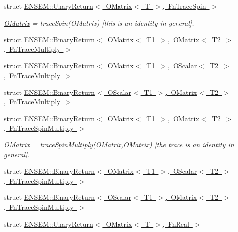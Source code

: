 \begin{DoxyCompactItemize}
struct \mbox{\hyperlink{structENSEM_1_1UnaryReturn_3_01OMatrix_3_01T_01_4_00_01FnTraceSpin_01_4}{E\+N\+S\+E\+M\+::\+Unary\+Return$<$ O\+Matrix$<$ T $>$, Fn\+Trace\+Spin $>$}}
\begin{DoxyCompactList}\small\item\em \mbox{\hyperlink{classENSEM_1_1OMatrix}{O\+Matrix}} = trace\+Spin(\+O\+Matrix) \mbox{[}this is an identity in general\mbox{]}. \end{DoxyCompactList}\item 
struct \mbox{\hyperlink{structENSEM_1_1BinaryReturn_3_01OMatrix_3_01T1_01_4_00_01OMatrix_3_01T2_01_4_00_01FnTraceMultiply_01_4}{E\+N\+S\+E\+M\+::\+Binary\+Return$<$ O\+Matrix$<$ T1 $>$, O\+Matrix$<$ T2 $>$, Fn\+Trace\+Multiply $>$}}
\item 
struct \mbox{\hyperlink{structENSEM_1_1BinaryReturn_3_01OMatrix_3_01T1_01_4_00_01OScalar_3_01T2_01_4_00_01FnTraceMultiply_01_4}{E\+N\+S\+E\+M\+::\+Binary\+Return$<$ O\+Matrix$<$ T1 $>$, O\+Scalar$<$ T2 $>$, Fn\+Trace\+Multiply $>$}}
\item 
struct \mbox{\hyperlink{structENSEM_1_1BinaryReturn_3_01OScalar_3_01T1_01_4_00_01OMatrix_3_01T2_01_4_00_01FnTraceMultiply_01_4}{E\+N\+S\+E\+M\+::\+Binary\+Return$<$ O\+Scalar$<$ T1 $>$, O\+Matrix$<$ T2 $>$, Fn\+Trace\+Multiply $>$}}
\item 
struct \mbox{\hyperlink{structENSEM_1_1BinaryReturn_3_01OMatrix_3_01T1_01_4_00_01OMatrix_3_01T2_01_4_00_01FnTraceSpinMultiply_01_4}{E\+N\+S\+E\+M\+::\+Binary\+Return$<$ O\+Matrix$<$ T1 $>$, O\+Matrix$<$ T2 $>$, Fn\+Trace\+Spin\+Multiply $>$}}
\begin{DoxyCompactList}\small\item\em \mbox{\hyperlink{classENSEM_1_1OMatrix}{O\+Matrix}} = trace\+Spin\+Multiply(\+O\+Matrix,\+O\+Matrix) \mbox{[}the trace is an identity in general\mbox{]}. \end{DoxyCompactList}\item 
struct \mbox{\hyperlink{structENSEM_1_1BinaryReturn_3_01OMatrix_3_01T1_01_4_00_01OScalar_3_01T2_01_4_00_01FnTraceSpinMultiply_01_4}{E\+N\+S\+E\+M\+::\+Binary\+Return$<$ O\+Matrix$<$ T1 $>$, O\+Scalar$<$ T2 $>$, Fn\+Trace\+Spin\+Multiply $>$}}
\item 
struct \mbox{\hyperlink{structENSEM_1_1BinaryReturn_3_01OScalar_3_01T1_01_4_00_01OMatrix_3_01T2_01_4_00_01FnTraceSpinMultiply_01_4}{E\+N\+S\+E\+M\+::\+Binary\+Return$<$ O\+Scalar$<$ T1 $>$, O\+Matrix$<$ T2 $>$, Fn\+Trace\+Spin\+Multiply $>$}}
\item 
struct \mbox{\hyperlink{structENSEM_1_1UnaryReturn_3_01OMatrix_3_01T_01_4_00_01FnReal_01_4}{E\+N\+S\+E\+M\+::\+Unary\+Return$<$ O\+Matrix$<$ T $>$, Fn\+Real $>$}}

\end{DoxyCompactItemize}
